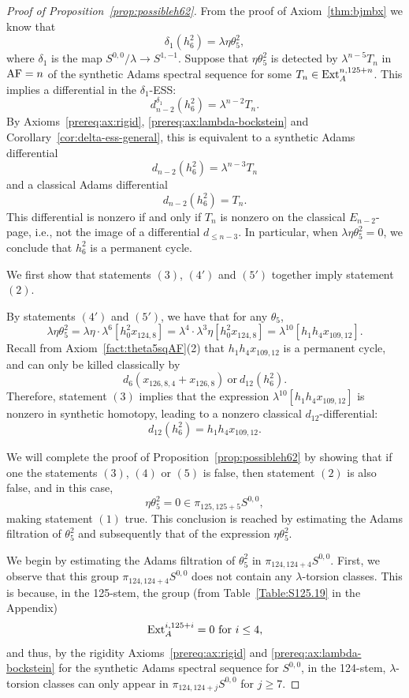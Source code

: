 \begin{proof}[Proof of Proposition~\ref{prop:possibleh62}]
    From the proof of Axiom~\ref{thm:bjmbx} \cite{BurklundXu} we know that
    $$\delta_1(h_6^2) = \lambda \eta \theta_5^2,$$
    where $\delta_1$ is the map $S^{0,0}/\lambda \rightarrow S^{1,-1}$. Suppose that $\eta \theta_5^2$ is detected by $\lambda^{n-5} T_n$ in $\mathrm{AF} = n$ of the synthetic Adams spectral sequence for some $T_n \in \mathrm{Ext}_A^{n, 125+n}$. This implies a differential in the $\delta_1$-ESS:
    $$d_{n-2}^{\delta_1} (h_6^2) = \lambda^{n-2} T_n.$$
    By Axioms~\ref{prereq:ax:rigid}, \ref{prereq:ax:lambda-bockstein} and Corollary~\ref{cor:delta-ess-general}, this is equivalent to a 
    synthetic Adams differential
    $$d_{n-2} (h_6^2) = \lambda^{n-3} T_n$$
    and a classical Adams differential
    $$d_{n-2} (h_6^2) = T_n.$$
    This differential is nonzero if and only if $T_n$ is nonzero on the classical $E_{n-2}$-page, i.e., not the image of a differential $d_{\le n-3}$. In particular, when $\lambda \eta \theta_5^2=0$, we conclude that $h_6^2$ is a permanent cycle.

    We first show that statements $(3)$, $(4')$ and $(5')$ together imply statement $(2)$.

    By statements $(4')$ and $(5')$, we have that for any $\theta_5$,
    $$\lambda \eta \theta_5^2 = \lambda \eta \cdot \lambda^6 [h_0^2x_{124,8}] = \lambda^4 \cdot \lambda^3 \eta [h_0^2x_{124,8}] = \lambda^{10} [h_1h_4x_{109,12}].$$
Recall from Axiom~\ref{fact:theta5sqAF}(2) that $h_1h_4x_{109,12}$ is a permanent cycle, and can only be killed classically by 
    $$d_6(x_{126,8,4} + x_{126,8}) \ \text{or} \ d_{12}(h_6^2).$$
    Therefore, statement $(3)$ implies that the expression $\lambda^{10} [h_1h_4x_{109,12}]$ is nonzero in synthetic homotopy, leading to a nonzero classical $d_{12}$-differential:
    $$d_{12}(h_6^2) = h_1h_4x_{109,12}.$$
    
We will complete the proof of
    Proposition~\ref{prop:possibleh62} by showing that if one the statements $(3)$, $(4)$ or $(5)$ is false, then statement $(2)$ is also false, and in this case, 
    $$\eta \theta_5^2 = 0 \in \pi_{125,125+5} S^{0,0},$$ 
    making statement $(1)$ true. This conclusion is reached by estimating the Adams filtration of $\theta_5^2$ and subsequently that of the expression $\eta \theta_5^2$. 



We begin by estimating the Adams filtration of $\theta_5^2$ in   $\pi_{124,124+4} S^{0,0}$. First, we observe that this group  $\pi_{124,124+4} S^{0,0}$ does not contain any $\lambda$-torsion classes. 
This is because, in the 125-stem, the group (from Table~\ref{Table:S125.19} in the Appendix) 
$$\mathrm{Ext}_A^{i,125+i} = 0 \ \text{for} \ i\leq 4,$$ 
and thus, by the rigidity Axioms~\ref{prereq:ax:rigid} and \ref{prereq:ax:lambda-bockstein} for the synthetic Adams spectral sequence for $S^{0,0}$, in the 124-stem, $\lambda$-torsion classes can only appear in $\pi_{124,124+j} S^{0,0}$ for $j \geq 7$.


\end{proof}
